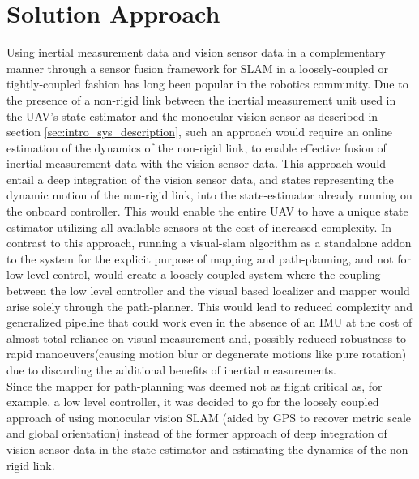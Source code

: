 \section{Solution Approach}
\label{sec:intro_sol_approach}
Using inertial measurement data and vision sensor data in a complementary manner through a sensor fusion framework for SLAM in a loosely-coupled\cite{6225147} or tightly-coupled\cite{Leutenegger-RSS-13} fashion has long been popular in the robotics community\cite{Hesch_towardsconsistent}. Due to the presence of a non-rigid link between the inertial measurement unit used in the UAV's state estimator and the monocular vision sensor as described in section \ref{sec:intro_sys_description}, such an approach would require an online estimation of the dynamics of the non-rigid link, to enable effective fusion of inertial measurement data with the vision sensor data. This approach would entail a deep integration of the vision sensor data, and states representing the dynamic motion of the non-rigid link, into the state-estimator \cite{6981466} already running on the onboard controller. This would enable the entire UAV to have a unique state estimator utilizing all available sensors at the cost of increased complexity. In contrast to this approach, running a visual-slam algorithm as a standalone addon to the system for the explicit purpose of mapping and path-planning, and not for low-level control, would create a loosely coupled system where the coupling between the low level controller and the visual based localizer and mapper would arise solely through the path-planner. This would lead to reduced complexity and generalized pipeline that could work even in the absence of an IMU at the cost of almost total reliance on visual measurement and, possibly reduced robustness to rapid manoeuvers(causing motion blur or degenerate motions like pure rotation) due to discarding the additional benefits of inertial measurements.\\
Since the mapper for path-planning was deemed not as flight critical as, for example, a low level controller, it was decided to go for the loosely coupled approach of using monocular vision SLAM (aided by GPS to recover metric scale and global orientation) instead of the former approach of deep integration of vision sensor data in the state estimator and estimating the dynamics of the non-rigid link.\\
